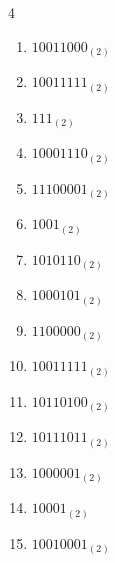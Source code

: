 \begin{multicols}{4}
\begin{enumerate}
        \phantom{$=54$}

  \item $10011000_{(2)}$

        \phantom{$=152$}

\columnbreak %

  \item $10011111_{(2)}$

        \phantom{$=159$}

  \item $111_{(2)}$

        \phantom{$=7$}

  \item $10001110_{(2)}$

        \phantom{$=142$}

  \item $11100001_{(2)}$

        \phantom{$=225$}

  \item $1001_{(2)}$

        \phantom{$=9$}

  \item $1010110_{(2)}$

        \phantom{$=86$}

  \item $1000101_{(2)}$

        \phantom{$=69$}

  \item $1100000_{(2)}$

        \phantom{$=96$}

  \item $10011111_{(2)}$

        \phantom{$=159$}

  \item $10110100_{(2)}$

        \phantom{$=180$}

  \item $10111011_{(2)}$

        \phantom{$=187$}

  \item $1000001_{(2)}$

        \phantom{$=65$}

  \item $10001_{(2)}$

        \phantom{$=17$}

  \item $10010001_{(2)}$


\end{enumerate}
\end{multicols}
